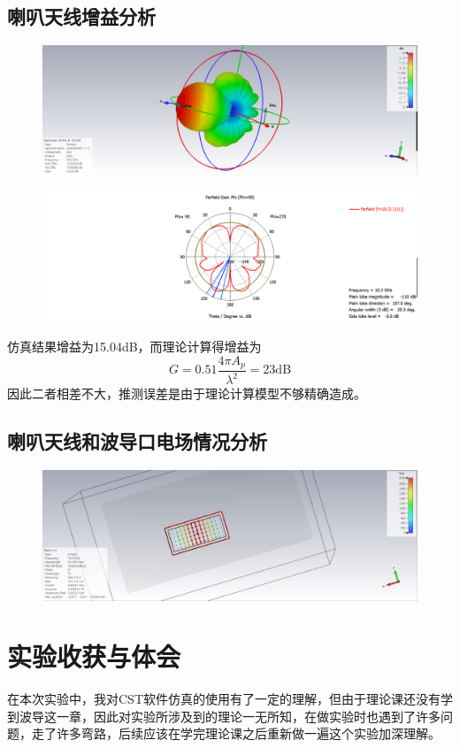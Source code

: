 \documentclass{source/Report}
\begin{document}
\subsection{喇叭天线增益分析}
\begin{figure}[H]
    \begin{center}
        \includegraphics[width=0.8\linewidth]{pic/cb2_p18.png}
        \caption{}
    \end{center}
\end{figure}
\begin{figure}[H]
    \begin{center}
        \includegraphics[width=0.8\linewidth]{pic/cb2_p19.png}
        \caption{}
    \end{center}
\end{figure}
仿真结果增益为15.04dB，而理论计算得增益为
$$G=0.51\dfrac{4\pi A_p}{\lambda^2}=23\text{dB}$$
因此二者相差不大，推测误差是由于理论计算模型不够精确造成。
\subsection{喇叭天线和波导口电场情况分析}
\begin{figure}[H]
    \begin{center}
        \includegraphics[width=0.8\linewidth]{pic/cb2_p20.png}
        \caption{}
    \end{center}
\end{figure}

\section{实验收获与体会}
在本次实验中，我对CST软件仿真的使用有了一定的理解，但由于理论课还没有学到波导这一章，因此对实验所涉及到的理论一无所知，在做实验时也遇到了许多问题，走了许多弯路，后续应该在学完理论课之后重新做一遍这个实验加深理解。
\end{document}
